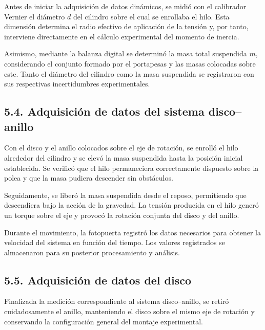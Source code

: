 \documentclass[11pt,a4paper]{article}
\begin{document}
Antes de iniciar la adquisición de datos dinámicos, se midió con el
calibrador Vernier el diámetro \(d\) del cilindro sobre el cual se
enrollaba el hilo. Esta dimensión determina el radio efectivo de
aplicación de la tensión y, por tanto, interviene directamente en el
cálculo experimental del momento de inercia.

Asimismo, mediante la balanza digital se determinó la masa total
suspendida \(m\), considerando el conjunto formado por el portapesas y
las masas colocadas sobre este. Tanto el diámetro del cilindro como la
masa suspendida se registraron con sus respectivas incertidumbres
experimentales.



\subsection*{5.4. Adquisición de datos del sistema disco--anillo}

Con el disco y el anillo colocados sobre el eje de rotación, se enrolló
el hilo alrededor del cilindro y se elevó la masa suspendida hasta la
posición inicial establecida. Se verificó que el hilo permaneciera
correctamente dispuesto sobre la polea y que la masa pudiera descender
sin obstáculos.

Seguidamente, se liberó la masa suspendida desde el reposo, permitiendo
que descendiera bajo la acción de la gravedad. La tensión producida en
el hilo generó un torque sobre el eje y provocó la rotación conjunta del
disco y del anillo.

Durante el movimiento, la fotopuerta registró los datos necesarios para
obtener la velocidad del sistema en función del tiempo. Los valores
registrados se almacenaron para su posterior procesamiento y análisis.



\subsection*{5.5. Adquisición de datos del disco}

Finalizada la medición correspondiente al sistema disco--anillo, se
retiró cuidadosamente el anillo, manteniendo el disco sobre el mismo eje
de rotación y conservando la configuración general del montaje
experimental.
\end{document}
